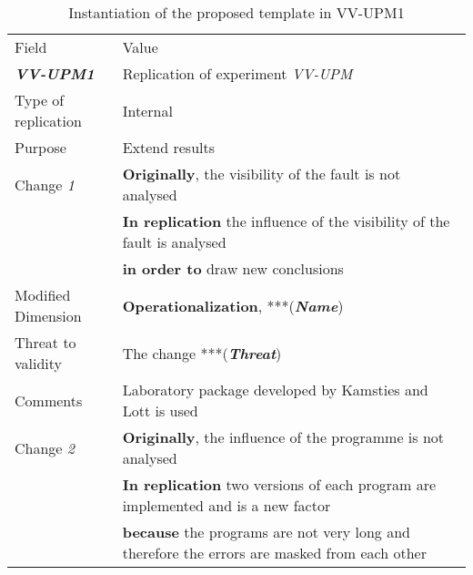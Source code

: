 
\begin{table*}[h]
  \caption{Instantiation of the proposed template in VV-UPM1}
\label{tab:plantEng}
  \centering

\begin{tabularx}{\textwidth}{
  >{\hsize=0.3\hsize}X
  >{\hsize=0.8\hsize}X}
  
    \noalign{\smallskip}\hline\noalign{\smallskip}
  
  Field &  Value  \\ 
  \noalign{\smallskip}\hline\noalign{\smallskip}
  
\textbf {\textit{VV-UPM1}} &  Replication of experiment \textit{VV-UPM}    \\
Type of replication &  Internal   \\  
Purpose  &  Extend results \\   \hline
    
    Change \textit{1}   & \textbf{Originally}, the visibility of the fault is not analysed \\& \textbf{In replication} the influence of the visibility of the fault is analysed \\& \textbf{in order to} draw new conclusions \\
    
     Modified Dimension & 
   \textbf{Operationalization}, ***(\textbf{\textit{Name}}) \\ 
    Threat to validity  & The change ***(\textbf{\textit{Threat}}) \\ 
    Comments & Laboratory package developed by Kamsties and Lott is used\\  \hline
    
    Change \textit{2}  & \textbf{Originally}, the influence of the programme is not analysed \\& \textbf{In replication} two versions of each program are implemented and is a new factor \\& \textbf{because} the programs are not very long and therefore the errors are masked from each other \\
    

\end{tabularx}
\end{table*}
